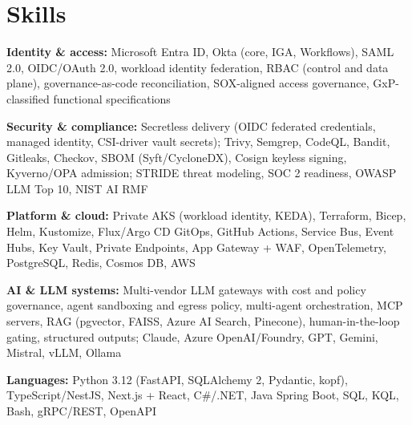 \documentclass[10pt,letterpaper]{article}
\newcommand{\szmeta}{\fontsize{8pt}{10pt}\selectfont}
\begin{document}
\section*{Skills}
{\szmeta \textbf{Identity \& access:} Microsoft Entra ID, Okta (core, IGA, Workflows), SAML 2.0, OIDC/OAuth 2.0, workload identity federation, RBAC (control and data plane), governance-as-code reconciliation, SOX-aligned access governance, GxP-classified functional specifications\par\vspace{2pt}\textbf{Security \& compliance:} Secretless delivery (OIDC federated credentials, managed identity, CSI-driver vault secrets); Trivy, Semgrep, CodeQL, Bandit, Gitleaks, Checkov, SBOM (Syft/CycloneDX), Cosign keyless signing, Kyverno/OPA admission; STRIDE threat modeling, SOC 2 readiness, OWASP LLM Top 10, NIST AI RMF\par\vspace{2pt}\textbf{Platform \& cloud:} Private AKS (workload identity, KEDA), Terraform, Bicep, Helm, Kustomize, Flux/Argo CD GitOps, GitHub Actions, Service Bus, Event Hubs, Key Vault, Private Endpoints, App Gateway + WAF, OpenTelemetry, PostgreSQL, Redis, Cosmos DB, AWS\par\vspace{2pt}\textbf{AI \& LLM systems:} Multi-vendor LLM gateways with cost and policy governance, agent sandboxing and egress policy, multi-agent orchestration, MCP servers, RAG (pgvector, FAISS, Azure AI Search, Pinecone), human-in-the-loop gating, structured outputs; Claude, Azure OpenAI/Foundry, GPT, Gemini, Mistral, vLLM, Ollama\par\vspace{2pt}\textbf{Languages:} Python 3.12 (FastAPI, SQLAlchemy 2, Pydantic, kopf), TypeScript/NestJS, Next.js + React, C\#/.NET, Java Spring Boot, SQL, KQL, Bash, gRPC/REST, OpenAPI}\par
\end{document}
